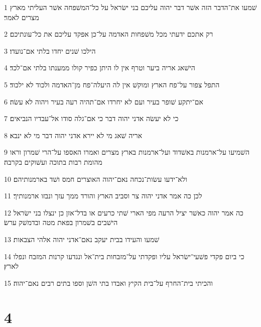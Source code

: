 \par 1 שׁמעו את־הדבר הזה אשׁר דבר יהוה עליכם בני ישׂראל על כל־המשׁפחה אשׁר העליתי מארץ מצרים לאמר׃
\par 2 רק אתכם ידעתי מכל משׁפחות האדמה על־כן אפקד עליכם את כל־עונתיכם׃
\par 3 הילכו שׁנים יחדו בלתי אם־נועדו׃
\par 4 הישׁאג אריה ביער וטרף אין לו היתן כפיר קולו ממענתו בלתי אם־לכד׃
\par 5 התפל צפור על־פח הארץ ומוקשׁ אין לה היעלה־פח מן־האדמה ולכוד לא ילכוד׃
\par 6 אם־יתקע שׁופר בעיר ועם לא יחרדו אם־תהיה רעה בעיר ויהוה לא עשׂה׃
\par 7 כי לא יעשׂה אדני יהוה דבר כי אם־גלה סודו אל־עבדיו הנביאים׃
\par 8 אריה שׁאג מי לא יירא אדני יהוה דבר מי לא ינבא׃
\par 9 השׁמיעו על־ארמנות באשׁדוד ועל־ארמנות בארץ מצרים ואמרו האספו על־הרי שׁמרון וראו מהומת רבות בתוכה ועשׁוקים בקרבה׃
\par 10 ולא־ידעו עשׂות־נכחה נאם־יהוה האוצרים חמס ושׁד בארמנותיהם׃
\par 11 לכן כה אמר אדני יהוה צר וסביב הארץ והורד ממך עזך ונבזו ארמנותיך׃
\par 12 כה אמר יהוה כאשׁר יציל הרעה מפי הארי שׁתי כרעים או בדל־אזן כן ינצלו בני ישׂראל הישׁבים בשׁמרון בפאת מטה ובדמשׁק ערשׂ׃
\par 13 שׁמעו והעידו בבית יעקב נאם־אדני יהוה אלהי הצבאות׃
\par 14 כי ביום פקדי פשׁעי־ישׂראל עליו ופקדתי על־מזבחות בית־אל ונגדעו קרנות המזבח ונפלו לארץ׃
\par 15 והכיתי בית־החרף על־בית הקיץ ואבדו בתי השׁן וספו בתים רבים נאם־יהוה׃

\chapter{4}

